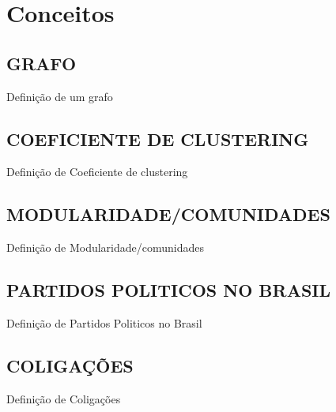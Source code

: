 \chapter{Conceitos}
\label{cap2_conceitos}

\section{\texorpdfstring{\MakeUppercase{Grafo}}{}}
\label{secao_grafo}

Definição de um grafo


\section{\texorpdfstring{\MakeUppercase{Coeficiente de clustering}}{}}
\label{secao_coeficiente_clustering}

Definição de Coeficiente de clustering

\section{\texorpdfstring{\MakeUppercase{Modularidade/comunidades}}{}}
\label{secao_modularidade_comuidades}

Definição de Modularidade/comunidades


\section{\texorpdfstring{\MakeUppercase{Partidos Politicos no Brasil}}{}}
\label{secao_partidos_brasil}

Definição de Partidos Politicos no Brasil


\section{\texorpdfstring{\MakeUppercase{Coligações}}{}}
\label{secao_coligacoes}

Definição de Coligações


